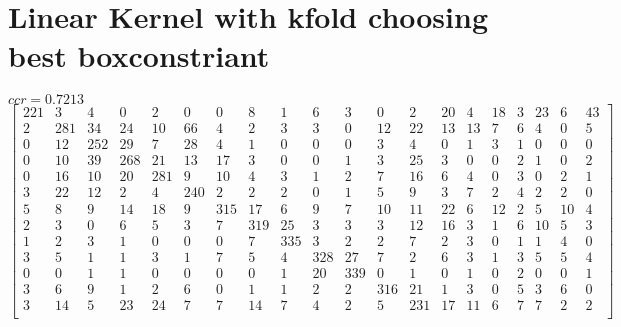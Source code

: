 \documentclass[a4paper, 11pt]{article}
\begin{document}
\section{Linear Kernel with kfold choosing best boxconstriant}
$ccr = 0.7213$
\[\begin{bmatrix}
221  &   3  &   4  &   0  &   2  &   0  &   0  &   8  &   1  &   6  &   3  &   0  &   2  &  20  &   4  &  18  &   3  &  23  &   6    & 43 \\
     2  & 281  &  34  &  24  &  10  &  66  &   4  &   2  &   3  &   3  &   0  &  12  &  22  &  13  &  13  &   7  &   6  &   4  &   0    &  5 \\
     0  &  12  & 252  &  29  &   7  &  28  &   4  &   1  &   0  &   0  &   0  &   3  &   4  &   0  &   1  &   3  &   1  &   0  &   0    &  0 \\
     0  &  10  &  39  & 268  &  21  &  13  &  17  &   3  &   0  &   0  &   1  &   3  &  25  &   3  &   0  &   0  &   2  &   1  &   0    &  2 \\
     0  &  16  &  10  &  20  & 281  &   9  &  10  &   4  &   3  &   1  &   2  &   7  &  16  &   6  &   4  &   0  &   3  &   0  &   2    &  1 \\
     3  &  22  &  12  &   2  &   4  & 240  &   2  &   2  &   2  &   0  &   1  &   5  &   9  &   3  &   7  &   2  &   4  &   2  &   2    &  0 \\
     5  &   8  &   9  &  14  &  18  &   9  & 315  &  17  &   6  &   9  &   7  &  10  &  11  &  22  &   6  &  12  &   2  &   5  &  10    &  4 \\
     2  &   3  &   0  &   6  &   5  &   3  &   7  & 319  &  25  &   3  &   3  &   3  &  12  &  16  &   3  &   1  &   6  &  10  &   5    &  3 \\
     1  &   2  &   3  &   1  &   0  &   0  &   0  &   7  & 335  &   3  &   2  &   2  &   7  &   2  &   3  &   0  &   1  &   1  &   4    &  0 \\
     3  &   5  &   1  &   1  &   3  &   1  &   7  &   5  &   4  & 328  &  27  &   7  &   2  &   6  &   3  &   1  &   3  &   5  &   5    &  4 \\
     0  &   0  &   1  &   1  &   0  &   0  &   0  &   0  &   1  &  20  & 339  &   0  &   1  &   0  &   1  &   0  &   2  &   0  &   0    &  1 \\
     3  &   6  &   9  &   1  &   2  &   6  &   0  &   1  &   1  &   2  &   2  & 316  &  21  &   1  &   3  &   0  &   5  &   3  &   6    &  0 \\
     3  &  14  &   5  &  23  &  24  &   7  &   7  &  14  &   7  &   4  &   2  &   5  & 231  &  17  &  11  &   6  &   7  &   7  &   2    &  2 \\

\end{bmatrix}\]
\end{document}
